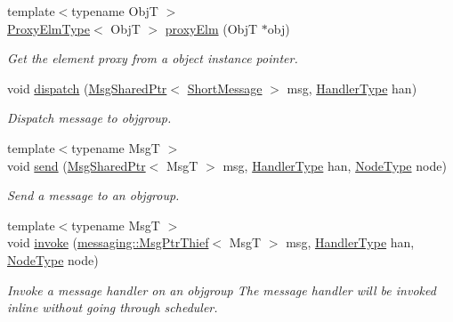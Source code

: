 \begin{DoxyCompactItemize}
{\footnotesize template$<$typename ObjT $>$ }\\\hyperlink{structvt_1_1objgroup_1_1_obj_group_manager_adba6c8ecb0f4c30e719f1abb995cfc9b}{Proxy\+Elm\+Type}$<$ ObjT $>$ \hyperlink{structvt_1_1objgroup_1_1_obj_group_manager_a31f00bd509986001e3154af24239f24d}{proxy\+Elm} (ObjT $\ast$obj)
\begin{DoxyCompactList}\small\item\em Get the element proxy from a object instance pointer. \end{DoxyCompactList}\item 
void \hyperlink{structvt_1_1objgroup_1_1_obj_group_manager_ad3e01d20b90d5447445538541025aa4b}{dispatch} (\hyperlink{namespacevt_ab2b3d506ec8e8d1540aede826d84a239}{Msg\+Shared\+Ptr}$<$ \hyperlink{namespacevt_a1125ac1da6c0bbf141e0ea0739d7602d}{Short\+Message} $>$ msg, \hyperlink{namespacevt_af64846b57dfcaf104da3ef6967917573}{Handler\+Type} han)
\begin{DoxyCompactList}\small\item\em Dispatch message to objgroup. \end{DoxyCompactList}\item 
{\footnotesize template$<$typename MsgT $>$ }\\void \hyperlink{structvt_1_1objgroup_1_1_obj_group_manager_a58abda8b7d1372bea7ca061402e69c75}{send} (\hyperlink{namespacevt_ab2b3d506ec8e8d1540aede826d84a239}{Msg\+Shared\+Ptr}$<$ MsgT $>$ msg, \hyperlink{namespacevt_af64846b57dfcaf104da3ef6967917573}{Handler\+Type} han, \hyperlink{namespacevt_a866da9d0efc19c0a1ce79e9e492f47e2}{Node\+Type} node)
\begin{DoxyCompactList}\small\item\em Send a message to an objgroup. \end{DoxyCompactList}\item 
{\footnotesize template$<$typename MsgT $>$ }\\void \hyperlink{structvt_1_1objgroup_1_1_obj_group_manager_a6b4dbae4a1da797a5d442de2cafc37f1}{invoke} (\hyperlink{structvt_1_1messaging_1_1_msg_ptr_thief}{messaging\+::\+Msg\+Ptr\+Thief}$<$ MsgT $>$ msg, \hyperlink{namespacevt_af64846b57dfcaf104da3ef6967917573}{Handler\+Type} han, \hyperlink{namespacevt_a866da9d0efc19c0a1ce79e9e492f47e2}{Node\+Type} node)
\begin{DoxyCompactList}\small\item\em Invoke a message handler on an objgroup The message handler will be invoked inline without going through scheduler. \end{DoxyCompactList}\item 

\end{DoxyCompactItemize}
